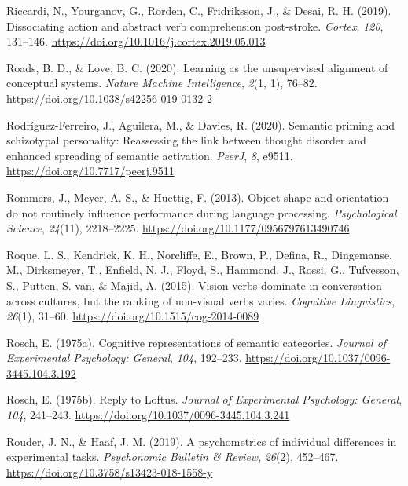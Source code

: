 \documentclass[
  12pt,
  man,floatsintext]{apa7}
\newlength{\cslhangindent}
\newlength{\cslentryspacingunit} %
\newenvironment{CSLReferences}[2] %
 {%
  \setlength{\parindent}{0pt}
  \ifodd #1
  \let\oldpar\par
  \def\par{\hangindent=\cslhangindent\oldpar}
  \fi
  \setlength{\parskip}{#2\cslentryspacingunit}
 }%
 {}
\begin{document}
\begin{CSLReferences}{1}{0}
\leavevmode{}%
Riccardi, N., Yourganov, G., Rorden, C., Fridriksson, J., \& Desai, R. H. (2019). Dissociating action and abstract verb comprehension post-stroke. \emph{Cortex}, \emph{120}, 131--146. \url{https://doi.org/10.1016/j.cortex.2019.05.013}

\leavevmode{}%
Roads, B. D., \& Love, B. C. (2020). Learning as the unsupervised alignment of conceptual systems. \emph{Nature Machine Intelligence}, \emph{2}(1, 1), 76--82. \url{https://doi.org/10.1038/s42256-019-0132-2}

\leavevmode{}%
Rodríguez-Ferreiro, J., Aguilera, M., \& Davies, R. (2020). Semantic priming and schizotypal personality: Reassessing the link between thought disorder and enhanced spreading of semantic activation. \emph{PeerJ}, \emph{8}, e9511. \url{https://doi.org/10.7717/peerj.9511}

\leavevmode{}%
Rommers, J., Meyer, A. S., \& Huettig, F. (2013). Object shape and orientation do not routinely influence performance during language processing. \emph{Psychological Science}, \emph{24}(11), 2218--2225. \url{https://doi.org/10.1177/0956797613490746}

\leavevmode{}%
Roque, L. S., Kendrick, K. H., Norcliffe, E., Brown, P., Defina, R., Dingemanse, M., Dirksmeyer, T., Enfield, N. J., Floyd, S., Hammond, J., Rossi, G., Tufvesson, S., Putten, S. van, \& Majid, A. (2015). Vision verbs dominate in conversation across cultures, but the ranking of non-visual verbs varies. \emph{Cognitive Linguistics}, \emph{26}(1), 31--60. \url{https://doi.org/10.1515/cog-2014-0089}

\leavevmode{}%
Rosch, E. (1975a). Cognitive representations of semantic categories. \emph{Journal of Experimental Psychology: General}, \emph{104}, 192--233. \url{https://doi.org/10.1037/0096-3445.104.3.192}

\leavevmode{}%
Rosch, E. (1975b). Reply to {Loftus}. \emph{Journal of Experimental Psychology: General}, \emph{104}, 241--243. \url{https://doi.org/10.1037/0096-3445.104.3.241}

\leavevmode{}%
Rouder, J. N., \& Haaf, J. M. (2019). A psychometrics of individual differences in experimental tasks. \emph{Psychonomic Bulletin \& Review}, \emph{26}(2), 452--467. \url{https://doi.org/10.3758/s13423-018-1558-y}


\end{CSLReferences}
\end{document}
